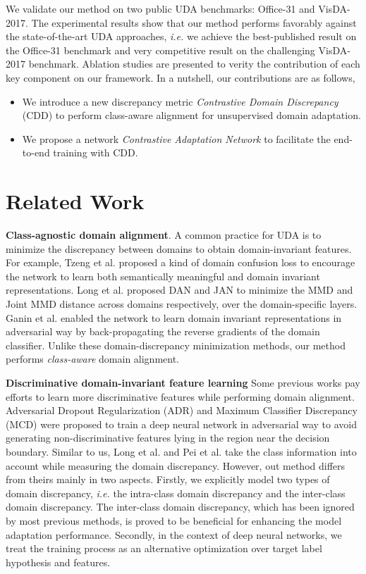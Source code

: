 \documentclass[conference]{IEEEtran}
\begin{document}
We validate our method on two public UDA benchmarks: Office-31 and VisDA-2017. The experimental results show that our method performs favorably against the state-of-the-art UDA approaches, \textit{i.e.} we achieve the best-published result on the Office-31 benchmark and very competitive result on the challenging VisDA-2017 benchmark.
Ablation studies are presented to verity the contribution of each key component on our framework.
In a nutshell, our contributions are as follows,
\begin{itemize}
    \item We introduce a new discrepancy metric \textit{Contrastive Domain Discrepancy} (CDD) to perform class-aware alignment for unsupervised domain adaptation.
    \item We propose a network \textit{Contrastive Adaptation Network} to facilitate the end-to-end training with CDD.
\end{itemize}

\section{Related Work}
\textbf{Class-agnostic domain alignment}. A common practice for UDA is to minimize the discrepancy between domains to obtain domain-invariant features.
For example, Tzeng et al. proposed a kind of domain confusion loss to encourage the network to learn both semantically meaningful and domain invariant representations.
Long et al. proposed DAN and JAN to minimize the MMD and Joint MMD distance across domains respectively, over the domain-specific layers. Ganin et al. enabled the network to learn domain invariant representations in adversarial way by back-propagating the reverse gradients of the domain classifier.
Unlike these domain-discrepancy minimization methods, our method performs \textit{class-aware} domain alignment.

\textbf{Discriminative domain-invariant feature learning} Some previous works pay efforts to learn more discriminative features while performing domain alignment.
Adversarial Dropout Regularization (ADR) and Maximum Classifier Discrepancy (MCD) were proposed to train a deep neural network in adversarial way to avoid generating non-discriminative features lying in the region near the decision boundary.
Similar to us, Long et al. and Pei et al. take the class information into account while measuring the domain discrepancy. However, out method differs from theirs mainly in two aspects.
Firstly, we explicitly model two types of domain discrepancy, \textit{i.e.} the intra-class domain discrepancy and the inter-class domain discrepancy. The inter-class domain discrepancy, which has been ignored by most previous methods, is proved to be beneficial for enhancing the model adaptation performance.
Secondly, in the context of deep neural networks, we treat the training process as an alternative optimization over target label hypothesis and features.
\end{document}
